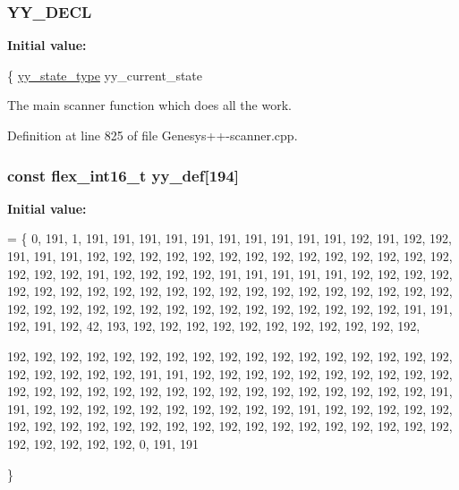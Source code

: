 \hypertarget{_genesys_09_09-scanner_8cpp_abcefb20c54ce0f92452cfbb9cf657670}{
\subsubsection[{Y\-Y\-\_\-\-D\-E\-C\-L}]{\setlength{\rightskip}{0pt plus 5cm}Y\-Y\-\_\-\-D\-E\-C\-L}}\label{_genesys_09_09-scanner_8cpp_abcefb20c54ce0f92452cfbb9cf657670}
{\bfseries Initial value\-:}
\begin{DoxyCode}
\{
    \hyperlink{_genesys_09_09-scanner_8cpp_a9ba7c416f135b0f0c1f4addded4616b5}{yy\_state\_type} yy\_current\_state
\end{DoxyCode}
The main scanner function which does all the work. 

Definition at line 825 of file Genesys++-\/scanner.\-cpp.

\hypertarget{_genesys_09_09-scanner_8cpp_a1298f0bc536600b0bf0afc339d7ea1ba}{
\subsubsection[{yy\-\_\-def}]{\setlength{\rightskip}{0pt plus 5cm}const {\bf flex\-\_\-int16\-\_\-t} yy\-\_\-def\mbox{[}194\mbox{]}\hspace{0.3cm}{\ttfamily [static]}}}\label{_genesys_09_09-scanner_8cpp_a1298f0bc536600b0bf0afc339d7ea1ba}
{\bfseries Initial value\-:}
\begin{DoxyCode}
=
    \{   0,
      191,    1,  191,  191,  191,  191,  191,  191,  191,  191,
      191,  191,  192,  191,  192,  192,  191,  191,  191,  192,
      192,  192,  192,  192,  192,  192,  192,  192,  192,  192,
      192,  192,  192,  192,  192,  192,  191,  192,  192,  192,
      192,  191,  191,  191,  191,  191,  192,  192,  192,  192,
      192,  192,  192,  192,  192,  192,  192,  192,  192,  192,
      192,  192,  192,  192,  192,  192,  192,  192,  192,  192,
      192,  192,  192,  192,  192,  192,  192,  192,  192,  192,
      192,  192,  191,  191,  192,  191,  192,   42,  193,  192,
      192,  192,  192,  192,  192,  192,  192,  192,  192,  192,

      192,  192,  192,  192,  192,  192,  192,  192,  192,  192,
      192,  192,  192,  192,  192,  192,  192,  192,  192,  192,
      192,  192,  191,  191,  192,  192,  192,  192,  192,  192,
      192,  192,  192,  192,  192,  192,  192,  192,  192,  192,
      192,  192,  192,  192,  192,  192,  192,  192,  192,  192,
      191,  191,  192,  192,  192,  192,  192,  192,  192,  192,
      192,  192,  191,  192,  192,  192,  192,  192,  192,  192,
      192,  192,  192,  192,  192,  192,  192,  192,  192,  192,
      192,  192,  192,  192,  192,  192,  192,  192,  192,  192,
        0,  191,  191

    \}
\end{DoxyCode}


